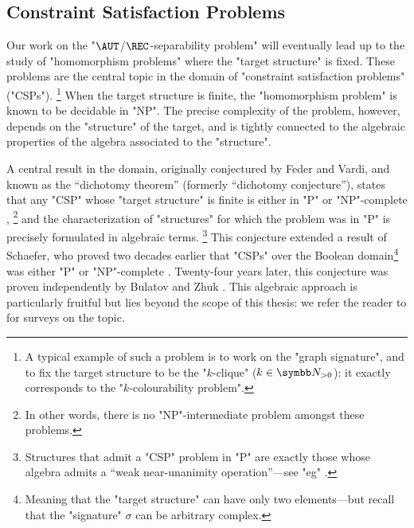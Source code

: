 \subsection{Constraint Satisfaction Problems}
\label{sec:dichotomy-intro-csp}

Our work on the "$\AUT$/$\REC$-separability problem" will eventually lead up to
the study of "homomorphism problems" where the "target structure" is fixed.
These problems are the central topic in the domain of "constraint satisfaction problems" ("CSPs").%
\footnote{A typical example of such a problem is to work on the "graph signature", and to fix the
target structure to be the "$k$-clique" ($k \in \Np$): it exactly corresponds to
the "$k$-colourability problem".}
When the target structure is finite, the "homomorphism problem" is known to be decidable
in "NP". The precise complexity of the problem, however, depends on the "structure" of the target,
and is tightly connected to the algebraic properties of the algebra associated to the
"structure".

A central result in the domain, originally conjectured by Feder and Vardi,
and known as the ``dichotomy theorem'' (formerly ``dichotomy conjecture''),
states that any "CSP" whose "target structure" is 
finite is either in "P" or "NP"-complete
\cite[\S~2, ``Dichotomy question'']{FederVardi1998ComputationalStructure},%
\footnote{In other words, there is no "NP"-intermediate 
problem amongst these problems.} and the characterization of "structures" for which the problem
was in "P" is precisely formulated in algebraic terms.%
\footnote{Structures that admit a "CSP" problem in "P" are exactly those whose algebra admits a
``weak near-unanimity operation''---see "eg" \cite[\S~1, p.~3]{Zhuk2020CSPDichotomy}.}
This conjecture extended a result of Schaefer, who proved two decades earlier
that "CSPs" over the Boolean domain\footnote{Meaning that the "target structure" can have only two elements---but recall that the "signature" $\sigma$ can be arbitrary complex.} was either "P" or "NP"-complete \cite[Theorem~2.1]{Schaefer1978ComplexitySatisfiability}.
Twenty-four years later, this conjecture was proven independently by
Bulatov \cite[Theorem 1]{Bulatov2017DichotomyCSPs}
and Zhuk \cite[Theorem 1.4]{Zhuk2020CSPDichotomy}.
This algebraic approach is particularly fruitful but lies beyond
the scope of this thesis: we refer the reader to \cite{BartoKrokhinWillard2017Polymorphisms,Larose2017DigraphCSP} for surveys on the topic.

